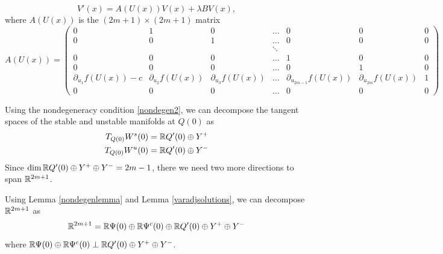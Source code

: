 \documentclass[11pt,reqno]{amsart}
\theoremstyle{plain}
\theoremstyle{definition}
\theoremstyle{remark}
\begin{document}
\begin{equation}\label{PDEeigsystem}
V'(x) = A(U(x))V(x) + \lambda B V(x),
\end{equation}
where $A(U(x))$ is the $(2m+1)\times(2m+1)$ matrix
\begin{equation}\label{defAphi}
A(U(x)) = 
\begin{pmatrix}
0 & 1 & 0 & \dots & 0 & 0 & 0 \\
0 & 0 & 1 & \dots & 0 & 0 & 0\\
&  && \ddots \\
0 & 0 & 0 & \dots & 1 & 0 & 0 \\
0 & 0 & 0 & \dots & 0 & 1 & 0 \\
\partial_{u_1}f(U(x)) - c & \partial_{u_2}f(U(x)) & \partial_{u_3}f(U(x)) & \dots & \partial_{u_{2m-1}}f(U(x)) & \partial_{u_{2m}}f(U(x)) & 1 \\
0 & 0 & 0 & \dots & 0 & 0 & 0
\end{pmatrix}
\end{equation}


Using the nondegeneracy condition \eqref{nondegen2}, we can decompose the tangent spaces of the stable and unstable manifolds at $Q(0)$ as
\begin{align*}
T_{Q(0)}W^s(0) &= \mathbb{R} Q'(0) \oplus Y^+ \\
T_{Q(0)}W^u(0) &= \mathbb{R} Q'(0) \oplus Y^-
\end{align*}
Since $\mathop\mathrm{dim}\nolimits \mathbb{R} Q'(0) \oplus Y^+ \oplus Y^- = 2m-1$, there we need two more directions to span $\mathbb{R}^{2m+1}$. 

Using Lemma \ref{nondegenlemma} and Lemma \ref{varadjsolutions}, we can decompose $\mathbb{R}^{2m+1}$ as  
\begin{equation}
\mathbb{R}^{2m+1} = \mathbb{R} \Psi(0) \oplus \mathbb{R} \Psi^c(0) \oplus \mathbb{R} Q'(0) \oplus Y^+ \oplus Y^-
\end{equation}
where $\mathbb{R} \Psi(0) \oplus \mathbb{R} \Psi^c(0) \perp \mathbb{R} Q'(0) \oplus Y^+ \oplus Y^-$.



\end{document}
